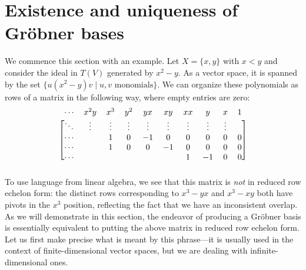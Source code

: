 \section{Existence and uniqueness of Gr\"obner bases}\label{sec:rref}
We commence this section with an example. Let $X = \{x,y\}$ with $x<y$ and consider the ideal in $T(V)$ generated by $x^2 - y$. As a vector space, it is spanned by the set $\{u(x^2 - y)v \mid u,v\text{ monomials}\}$. We can organize these polynomials as rows of a matrix in the following way, where empty entries are zero:
\[
	\begin{blockarray}{cccccccccc}
	\cdots & x^2 y & x^3 & y^2 & yx & xy & xx & y & x & 1\\
	\begin{block}{[cccccccccc]}
	\ddots&\vdots& \vdots & \vdots& \vdots& \vdots& \vdots& \vdots& \vdots\\
	\cdots&&1 & 0 & -1 & 0 & 0 & 0 & 0 & 0\\
	\cdots&&1 & 0 & 0 & -1 & 0 & 0 & 0 & 0\\
	\cdots&& &  &  &  & 1 & -1 & 0 & 0\\
	\end{block}
	\end{blockarray}
\]
To use language from linear algebra, we see that this matrix is \emph{not} in reduced row echelon form: the distinct rows corresponding to $x^3 - yx$ and $x^3 - xy$ both have pivots in the $x^3$ position, reflecting the fact that we have an inconsistent overlap. As we will demonstrate in this section, the endeavor of producing a Gr\"obner basis is essentially equivalent to putting the above matrix in reduced row echelon form. Let us first make precise what is meant by this phrase---it is usually used in the context of finite-dimensional vector spaces, but we are dealing with infinite-dimensional ones.

